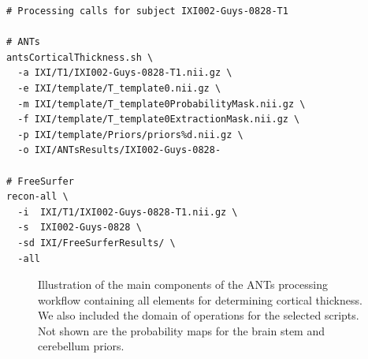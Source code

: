 \begin{lstlisting}
# Processing calls for subject IXI002-Guys-0828-T1

# ANTs
antsCorticalThickness.sh \
  -a IXI/T1/IXI002-Guys-0828-T1.nii.gz \
  -e IXI/template/T_template0.nii.gz \
  -m IXI/template/T_template0ProbabilityMask.nii.gz \
  -f IXI/template/T_template0ExtractionMask.nii.gz \  
  -p IXI/template/Priors/priors%d.nii.gz \
  -o IXI/ANTsResults/IXI002-Guys-0828-

# FreeSurfer  
recon-all \
  -i  IXI/T1/IXI002-Guys-0828-T1.nii.gz \
  -s  IXI002-Guys-0828 \
  -sd IXI/FreeSurferResults/ \
  -all
\end{lstlisting}

\begin{figure}
  \centering
  \caption{Illustration of the main components of the ANTs processing 
  workflow containing all elements for determining cortical thickness. 
  We also included the domain of operations for the selected scripts.
  Not shown are the probability maps for the brain stem and cerebellum
  priors.}
  \label{fig:pipeline}
\end{figure}

